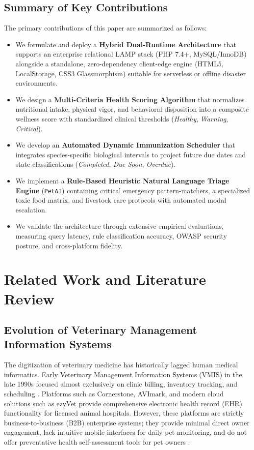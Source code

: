 \documentclass[conference]{IEEEtran}
\begin{document}
\subsection{Summary of Key Contributions}
The primary contributions of this paper are summarized as follows:
\begin{itemize}
    \item We formulate and deploy a \textbf{Hybrid Dual-Runtime Architecture} that supports an enterprise relational LAMP stack (PHP 7.4+, MySQL/InnoDB) alongside a standalone, zero-dependency client-edge engine (HTML5, LocalStorage, CSS3 Glassmorphism) suitable for serverless or offline disaster environments.
    \item We design a \textbf{Multi-Criteria Health Scoring Algorithm} that normalizes nutritional intake, physical vigor, and behavioral disposition into a composite wellness score with standardized clinical thresholds (\textit{Healthy}, \textit{Warning}, \textit{Critical}).
    \item We develop an \textbf{Automated Dynamic Immunization Scheduler} that integrates species-specific biological intervals to project future due dates and state classifications (\textit{Completed}, \textit{Due Soon}, \textit{Overdue}).
    \item We implement a \textbf{Rule-Based Heuristic Natural Language Triage Engine} (\texttt{PetAI}) containing critical emergency pattern-matchers, a specialized toxic food matrix, and livestock care protocols with automated modal escalation.
    \item We validate the architecture through extensive empirical evaluations, measuring query latency, rule classification accuracy, OWASP security posture, and cross-platform fidelity.
\end{itemize}

\section{Related Work and Literature Review}
\subsection{Evolution of Veterinary Management Information Systems}
The digitization of veterinary medicine has historically lagged human medical informatics. Early Veterinary Management Information Systems (VMIS) in the late 1990s focused almost exclusively on clinic billing, inventory tracking, and scheduling \cite{smith2018}. Platforms such as Cornerstone, AVImark, and modern cloud solutions such as ezyVet provide comprehensive electronic health record (EHR) functionality for licensed animal hospitals. However, these platforms are strictly business-to-business (B2B) enterprise systems; they provide minimal direct owner engagement, lack intuitive mobile interfaces for daily pet monitoring, and do not offer preventative health self-assessment tools for pet owners \cite{adams2021}.
\end{document}
